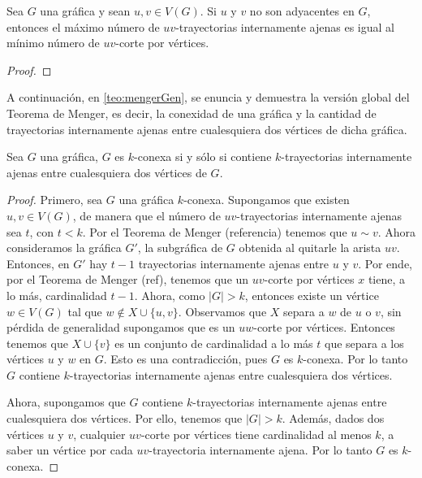 
\begin{teorema}
    \label{teo:menger}
    Sea $G$ una gr\'afica y sean $u, v \in V(G)$. Si $u$ y $v$ no son adyacentes
    en $G$, entonces el m\'aximo n\'umero de $uv$-trayectorias internamente
    ajenas es igual al m\'inimo n\'umero de $uv$-corte por v\'ertices.
\end{teorema}

\begin{proof}
    
\end{proof}

A continuaci\'on, en \cref{teo:mengerGen}, se enuncia y demuestra la versi\'on
global del Teorema de Menger, es decir, la conexidad de una gr\'afica y la
cantidad de trayectorias internamente ajenas entre cualesquiera dos v\'ertices
de dicha gr\'afica.

\begin{teorema}
    \label{teo:mengerGen}
     Sea $G$ una gr\'afica, $G$ es $k$-conexa si y s\'olo si contiene
     $k$-trayectorias internamente ajenas entre cualesquiera dos v\'ertices de
     $G$.
 \end{teorema}

 \begin{proof}
     Primero, sea $G$ una gr\'afica $k$-conexa. Supongamos que existen $u,v \in
     V(G)$, de manera que el n\'umero de $uv$-trayectorias internamente ajenas
     sea $t$, con $t<k$. Por el Teorema de Menger (referencia) tenemos que $u\sim
     v$. Ahora consideramos la gr\'afica $G'$, la subgr\'afica de $G$ obtenida al
     quitarle la arista $uv$. Entonces, en $G'$ hay $t-1$ trayectorias
     internamente ajenas entre $u$ y $v$. Por ende, por el Teorema de Menger
     (ref), tenemos que un $uv$-corte por v\'ertices $x$ tiene, a lo m\'as,
     cardinalidad $t-1$. Ahora, como $|G|>k$, entonces existe un v\'ertice $w \in
     V(G)$ tal que $w \notin X\cup\{u,v\}$. Observamos que $X$ separa a $w$ de
     $u$ o $v$, sin p\'erdida de generalidad supongamos que es un $uw$-corte por
     v\'ertices. Entonces tenemos que $X\cup\{v\}$ es un conjunto de cardinalidad
     a lo m\'as $t$ que separa a los v\'ertices $u$ y $w$ en $G$. Esto es una
     contradicci\'on, pues $G$ es $k$-conexa. Por lo tanto $G$ contiene
     $k$-trayectorias internamente ajenas entre cualesquiera dos v\'ertices.
 
     Ahora, supongamos que $G$ contiene $k$-trayectorias internamente ajenas
     entre cualesquiera dos v\'ertices. Por ello, tenemos que $|G|>k$. Adem\'as,
     dados dos v\'ertices $u$ y $v$, cualquier $uv$-corte por v\'ertices tiene
     cardinalidad al menos $k$, a saber un v\'ertice por cada $uv$-trayectoria
     internamente ajena. Por lo tanto $G$ es $k$-conexa.
         
 \end{proof}
 

